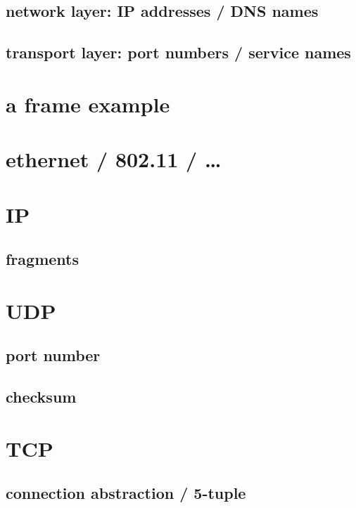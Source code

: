 \subsection{network layer: IP addresses / DNS names}

\subsection{transport layer: port numbers / service names}


\section{a frame example}


\section{ethernet / 802.11 / \ldots}

\section{IP}

\subsection{fragments}

\section{UDP}

\subsection{port number}

\subsection{checksum}

\section{TCP}

\subsection{connection abstraction / 5-tuple}

